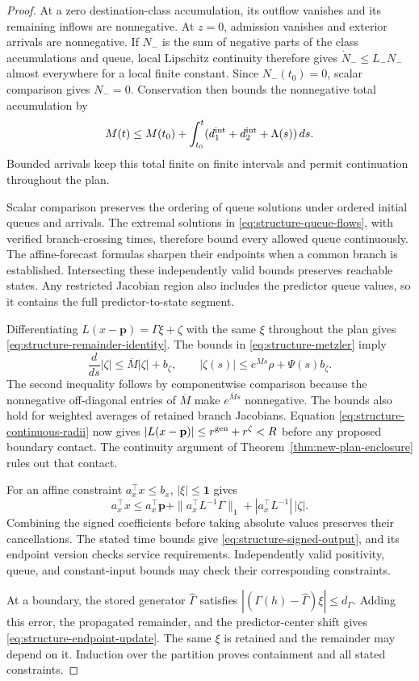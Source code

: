 \documentclass[preprint,12pt]{elsarticle}
\theoremstyle{definition}
\theoremstyle{plain}
\theoremstyle{definition}
\theoremstyle{plain}
\begin{document}
\begin{proof}
At a zero destination-class accumulation, its outflow vanishes and its
remaining inflows are nonnegative. At $z=0$, admission vanishes and
exterior arrivals are nonnegative. If $N_-$ is the sum of negative parts
of the class accumulations and queue, local Lipschitz continuity therefore
gives $\dot N_-\le L_-N_-$ almost everywhere for a local finite constant.
Since $N_-(t_0)=0$, scalar comparison \cite{khalil2002nonlinear}
gives $N_-=0$. Conservation then bounds
the nonnegative total accumulation by
\[
 M(t)\le M(t_0)+\int_{t_0}^t
       (d_1^{\rm int}+d_2^{\rm int}+\Lambda(s))\,ds.
\]
Bounded arrivals keep this total finite on finite intervals and permit
continuation throughout the plan.

Scalar comparison preserves the ordering of queue solutions under
ordered initial queues and arrivals. The extremal solutions in
\eqref{eq:structure-queue-flows}, with verified branch-crossing times,
therefore bound every allowed queue continuously. The affine-forecast
formulas sharpen their endpoints when a common branch is established.
Intersecting these independently valid bounds preserves reachable states.
Any restricted Jacobian region also includes the predictor queue values,
so it contains the full predictor-to-state segment.

Differentiating $L(x-\mathbf p)=\Gamma\xi+\zeta$ with the same
$\xi$ throughout the plan gives \eqref{eq:structure-remainder-identity}.
The bounds in \eqref{eq:structure-metzler} imply
\[
 \frac{d}{ds}|\zeta|\le\overline M|\zeta|+b_\zeta,
 \qquad
 |\zeta(s)|\le e^{\overline M s}\rho+\Psi(s)b_\zeta.
\]
The second inequality follows by componentwise comparison because the
nonnegative off-diagonal entries of $\overline M$ make
$e^{\overline M s}$ nonnegative. The bounds also hold for weighted
averages of retained branch Jacobians. Equation
\eqref{eq:structure-continuous-radii} now gives
$|L(x-\mathbf p)|\le r^{\rm gen}+r^\zeta<R$ before any proposed boundary contact.
The continuity argument of Theorem~\ref{thm:new-plan-enclosure} rules
out that contact.

For an affine constraint $a_x^\top x\le b_x$, $|\xi|\le\mathbf1$ gives
\[
 a_x^\top x\le a_x^\top\mathbf p+
       \|a_x^\top L^{-1}\Gamma\|_1+
       |a_x^\top L^{-1}|\,|\zeta|.
\]
Combining the signed coefficients before taking absolute values preserves
their cancellations. The stated time bounds give
\eqref{eq:structure-signed-output}, and its endpoint version checks
service requirements. Independently valid positivity, queue, and
constant-input bounds may check their corresponding constraints.

At a boundary, the stored generator $\widehat\Gamma$ satisfies
$|(\Gamma(h)-\widehat\Gamma)\xi|\le d_\Gamma$. Adding this error,
the propagated remainder, and the predictor-center shift gives
\eqref{eq:structure-endpoint-update}. The same $\xi$ is retained and
the remainder may depend on it. Induction over the partition proves
containment and all stated constraints.
\end{proof}
\end{document}
